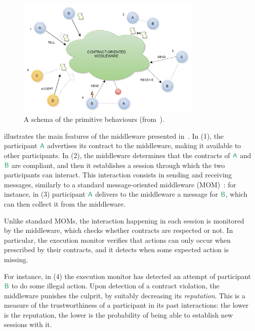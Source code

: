 \begin{figure}[t]
  \centering
  \includegraphics[width=0.8\textwidth]{primitive-schema.png}
  \caption{A schema of the primitive behaviours (from~\cite{CO2}).} 
  \label{fig:primitives}
\end{figure}

 illustrates the main features of the middleware
presented in~\cite{CO2middleware}. %
In (1), the participant $\pmv A$ advertises its contract to the middleware, %
making it available to other participants.
%
In (2), the middleware determines that the contracts of 
$\pmv A$ and $\pmv B$ are compliant,
and then it establishes a session through which
the two participants can interact. %
This interaction consists in sending and receiving messages, 
similarly to a standard message-oriented middleware (MOM)~\cite{Banavar99dc}: %
for instance, in (3) participant $\pmv A$ delivers to the middleware a message for $\pmv B$,
which can then collect it from the middleware.

Unlike standard MOMs, the interaction happening in each session is monitored by the middleware, 
which checks whether contracts are respected or not. 
In particular, the execution monitor verifies that 
actions can only occur when prescribed by their contracts, %
and it detects when some expected action is missing.

For instance, in (4) the execution monitor has detected  
an attempt of participant $\pmv B$ to do some illegal action. %
Upon detection of a contract violation, the middleware 
punishes the culprit, %
by suitably decreasing its \emph{reputation}. 
This is a measure of the trustworthiness of a participant
in its past interactions: the lower is the reputation,
the lower is the probability of being able to establish new sessions with it.

